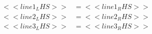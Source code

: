 \begin{varwidth}{0.25\paperwidth}
    \begin{align*}
    <<line1_LHS>> &= <<line1_RHS>>\\
    <<line2_LHS>> &= <<line2_RHS>>\\
    <<line3_LHS>> &= <<line3_RHS>>\\
\end{align*}
\end{varwidth}
